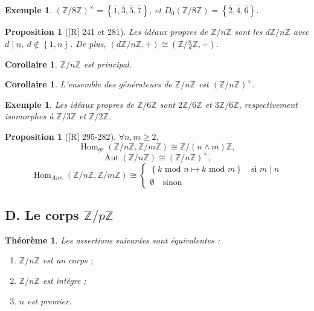 \documentclass[10pt, a4paper, parskip=full, twoside, twocolumn]{report}
\newtheorem{theorem}[definition]{Théorème}
\newtheorem{proposition}[definition]{Proposition}
\newtheorem{corollary}[definition]{Corollaire}
\newtheorem{example}[definition]{Exemple}
\newcommand{\IZ}{\mathbb{Z}}
\newcommand{\IZnZ}{\mathbb{Z}/n\mathbb{Z}}
\DeclareMathOperator{\Hom}{Hom}
\DeclareMathOperator{\Aut}{Aut}
\begin{document}
\begin{example}
	$\left(\IZ/8\IZ\right)^{\times} = \left\{\overline{1},\overline{3},\overline{5},\overline{7}\right\}$, et 
	$D_0\left(\IZ/8\IZ\right) = \left\{\overline{2},\overline{4},\overline{6}\right\}$.
\end{example}

\begin{proposition}[\textnormal{[R] 241 et 281}]
	Les idéaux propres de $\IZnZ$ sont les $d\IZnZ$ avec $d\mid n$, $d\notin \left\{1,n\right\}$.
	De plus, $\left(d\IZnZ, +\right)\cong \left(\IZ/\frac{n}{d}\IZ, +\right)$.
\end{proposition}

\begin{corollary}
	$\IZnZ$ est principal.
\end{corollary}

\begin{corollary}
	L'ensemble des générateurs de $\IZnZ$ est $\left(\IZnZ\right)^{\times}$.
\end{corollary}

\begin{example}
	Les idéaux propres de $\IZ/6\IZ$ sont $2\IZ/6\IZ$ et $3\IZ/6\IZ$, respectivement isomorphes à $\IZ/3\IZ$ et $\IZ/2\IZ$.
\end{example}

\begin{proposition}[\textnormal{[R] 295-282}]
	$\forall n,m\geq 2$, 
	$$\Hom_{gr}(\IZnZ, \IZ/m\IZ)\cong \IZ/(n\wedge m)\IZ,$$
	$$\Aut(\IZnZ)\cong \left(\IZnZ\right)^{\times},$$
	$$\Hom_{Ann}(\IZnZ, \IZ/m\IZ)\cong  \begin{cases}
		\left\{k\text{ mod } n \mapsto k \text{ mod } m\right\} \quad\text{si } m\mid n \\
		\emptyset\quad\text{sinon}
	\end{cases}$$
\end{proposition}

\subsection*{D. Le corps $\IZ/p\IZ$}
\begin{theorem}
	Les assertions suivantes sont équivalentes :
	\begin{enumerate}
		\item $\IZnZ$ est un corps ;
		\item $\IZnZ$ est intègre ;
		\item $n$ est premier.
	\end{enumerate}
\end{theorem}
\end{document}
